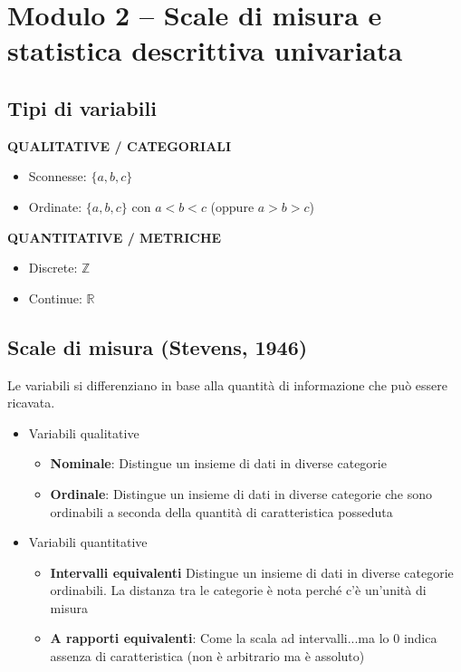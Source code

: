 \documentclass[
  a4paper,
  DIV=11,
  numbers=noendperiod]{scrreprt}
\providecommand{\tightlist}{%
  \setlength{\itemsep}{0pt}\setlength{\parskip}{0pt}}
\begin{document}
\chapter{Modulo 2 -- Scale di misura e statistica descrittiva
univariata}\label{modulo-2-scale-di-misura-e-statistica-descrittiva-univariata}

\section{Tipi di variabili}\label{tipi-di-variabili}

\textbf{QUALITATIVE / CATEGORIALI}

\begin{itemize}
\tightlist
\item
  Sconnesse: \(\{a, b, c\}\)
\item
  Ordinate: \(\{a, b, c\}\) con \(a < b < c\) (oppure \(a > b > c\))
\end{itemize}

\textbf{QUANTITATIVE / METRICHE}

\begin{itemize}
\tightlist
\item
  Discrete: \(\mathbb{Z}\)
\item
  Continue: \(\mathbb{R}\)
\end{itemize}

\section{Scale di misura (Stevens,
1946)}\label{scale-di-misura-stevens-1946}

Le variabili si differenziano in base alla quantità di informazione che
può essere ricavata.

\begin{itemize}
\item Variabili qualitative
\begin{itemize}
\item \textbf{Nominale}: Distingue un insieme di dati in diverse categorie
\item \textbf{Ordinale}: Distingue un insieme di dati in diverse categorie che sono ordinabili a seconda della quantità di caratteristica posseduta 
\end{itemize}
    
\item Variabili quantitative
    
\begin{itemize}
\item \textbf{Intervalli equivalenti} Distingue un insieme di dati in diverse categorie ordinabili. La distanza tra le categorie è nota perché c'è un'unità di misura
\item \textbf{A rapporti equivalenti}: Come la scala ad intervalli...ma lo 0 indica assenza di caratteristica (non è arbitrario ma è assoluto) 
\end{itemize}
\end{itemize}
\end{document}
